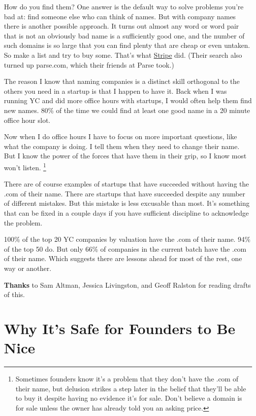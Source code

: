\documentclass[12pt]{book}
\begin{document}
How do you find them? One answer is the default way to solve problems
you're bad at: find someone else who can think of names. But with
company names there is another possible approach. It turns out almost
any word or word pair that is not an obviously bad name is a
sufficiently good one, and the number of such domains is so large that
you can find plenty that are cheap or even untaken. So make a list and
try to buy some. That's what
\href{http://www.quora.com/How-did-Stripe-come-up-with-its-name?share=1}{Stripe}
did. (Their search also turned up parse.com, which their friends at
Parse took.)

The reason I know that naming companies is a distinct skill orthogonal
to the others you need in a startup is that I happen to have it. Back
when I was running YC and did more office hours with startups, I would
often help them find new names. 80\% of the time we could find at least
one good name in a 20 minute office hour slot.

Now when I do office hours I have to focus on more important questions,
like what the company is doing. I tell them when they need to change
their name. But I know the power of the forces that have them in their
grip, so I know most won't listen. \footnote{Sometimes founders know it's a problem that they don't have the
.com of their name, but delusion strikes a step later in the belief that
they'll be able to buy it despite having no evidence it's for sale.
Don't believe a domain is for sale unless the owner has already told you
an asking price.}

There are of course examples of startups that have succeeded without
having the .com of their name. There are startups that have succeeded
despite any number of different mistakes. But this mistake is less
excusable than most. It's something that can be fixed in a couple days
if you have sufficient discipline to acknowledge the problem.

100\% of the top 20 YC companies by valuation have the .com of their
name. 94\% of the top 50 do. But only 66\% of companies in the current
batch have the .com of their name. Which suggests there are lessons
ahead for most of the rest, one way or another.


\textbf{Thanks} to Sam Altman, Jessica Livingston, and Geoff Ralston for
reading drafts of this.
\chapter{Why It's Safe for Founders to Be Nice}
\end{document}

